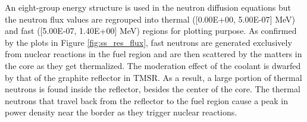 \documentclass{elsarticle}
\begin{document}
An eight-group energy structure is used in the neutron diffusion equations but the neutron flux values are regrouped into thermal ([0.00E+00, 5.00E-07] MeV) and fast ([5.00E-07, 1.40E+00] MeV) regions for plotting purpose. As confirmed by the plots in Figure \ref{fig:ss_res_flux}, fast neutrons are generated exclusively from nuclear reactions in the fuel region and are then scattered by the matters in the core as they get thermalized. 
The moderation effect of the coolant is dwarfed by that of the graphite reflector in TMSR. As a result, a large portion of thermal neutrons is found inside the reflector, besides the center of the core.
The thermal neutrons that travel back from the reflector to the fuel region cause a peak in power density near the border as they trigger nuclear reactions. 

\begin{figure}
    

\end{figure}
\end{document}
